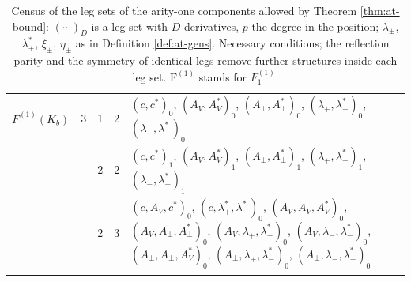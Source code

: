 \documentclass[11pt]{article}
\numberwithin{equation}{section}
\theoremstyle{plain}
\theoremstyle{definition}
\begin{document}
{\begin{longtable}{>{\raggedright}p{2.3cm}|p{0.6cm}|p{0.25cm}|p{0.25cm}|>{\raggedright\arraybackslash}p{11.6cm}}
\hline
$F_1^{(1)}(K_b)$ & $3$ & 1 & 2 & $(c,c^*)_{0}$, $(A_V,A^*_V)_{0}$, $(A_\perp,A^*_\perp)_{0}$, $(\lambda_+,\lambda^*_+)_{0}$, $(\lambda_-,\lambda^*_-)_{0}$ \\
 &  & 2 & 2 & $(c,c^*)_{1}$, $(A_V,A^*_V)_{1}$, $(A_\perp,A^*_\perp)_{1}$, $(\lambda_+,\lambda^*_+)_{1}$, $(\lambda_-,\lambda^*_-)_{1}$ \\
 &  & 2 & 3 & $(c,A_V,c^*)_{0}$, $(c,\lambda^*_+,\lambda^*_-)_{0}$, $(A_V,A_V,A^*_V)_{0}$, $(A_V,A_\perp,A^*_\perp)_{0}$, $(A_V,\lambda_+,\lambda^*_+)_{0}$, $(A_V,\lambda_-,\lambda^*_-)_{0}$, $(A_\perp,A_\perp,A^*_V)_{0}$, $(A_\perp,\lambda_+,\lambda^*_-)_{0}$, $(A_\perp,\lambda_-,\lambda^*_+)_{0}$ \\
\hline

\caption{Census of the leg sets of the arity-one components allowed by Theorem \ref{thm:at-bound}: $(\cdots)_D$ is a leg set with $D$ derivatives, $p$ the degree in the position; $\lambda_\pm$, $\lambda^*_\pm$, $\xi_\pm$, $\eta_\pm$ as in Definition \ref{def:at-gens}. Necessary conditions; the reflection parity and the symmetry of identical legs remove further structures inside each leg set. $\mathrm{F}^{(1)}$ stands for $F_1^{(1)}$.}
\label{tab:at-census1}
\end{longtable}

}
\end{document}
